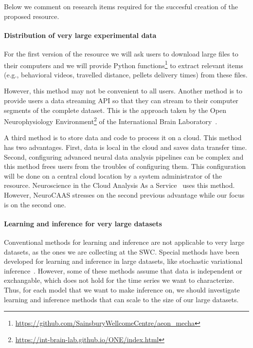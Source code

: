 Below we comment on research items required for the succesful creation of the
proposed resource.

\paragraph{Distribution of very large experimental data}

For the first version of the resource we will ask users to download large files
to their computers and we will provide Python
functions\footnote{\url{https://github.com/SainsburyWellcomeCentre/aeon\_mecha}}
to extract relevant items (e.g., behavioral videos, travelled distance, pellets
delivery times) from these files.

However, this method may not be convenient to all users. Another method is to
provide users a data streaming API so that they can stream to their computer
segments of the complete dataset. This is the approach taken by the Open
Neurophysiology
Environment\footnote{\url{https://int-brain-lab.github.io/ONE/index.html}} of
the International Brain Laboratory~\citep{bonacchiEtAl23}.

A third method is to store data and code to process it on a cloud. This method
has two advantages. First, data is local in the cloud and saves data transfer
time. Second, configuring advanced neural data analysis pipelines can be
complex and this method frees users from the troubles of configuring them. This
configuration will be done on a central cloud location by a system
administrator of the resource. Neuroscience in the Cloud Analysis As a
Service~\citep[NeuroCASS][]{abeEtAl22} uses this method. However, NeuroCAAS
stresses on the second previous advantage while our focus is on the second one.

\paragraph{Learning and inference for very large datasets}

Conventional methods for learning and inference are not applicable to very
large datasets, as the ones we are collecting at the SWC. Special methods have
been developed for learning and inference in large datasets, like stochastic
variational inference~\citep{hoffmanEtAl13}. However, some of these methods
assume that data is independent or exchangable, which does not hold for the
time series we want to characterize. Thus, for each model that we want to make
inference on, we should investigate learning and inference methods that can
scale to the size of our large datasets.

